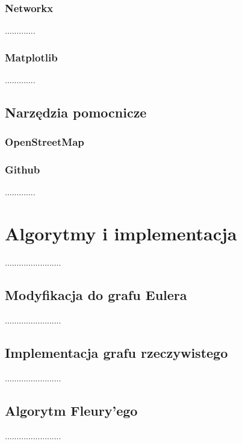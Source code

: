\documentclass[a4paper, 12pt, twoside, openright]{article}
\begin{document}
\subsubsection{Networkx}
\indent\par
.............

\subsubsection{Matplotlib}
\indent\par
.............



\subsection{Narzędzia pomocnicze}
\indent\par
\subsubsection{OpenStreetMap}
\subsubsection{Github}
\indent\par
.............




\newpage
\section{Algorytmy i implementacja}
\indent\par
........................




\subsection{Modyfikacja do grafu Eulera}
\indent\par
........................

\subsection{Implementacja grafu rzeczywistego}
\indent\par
........................

\subsection{Algorytm Fleury’ego}
\indent\par
........................
\end{document}
